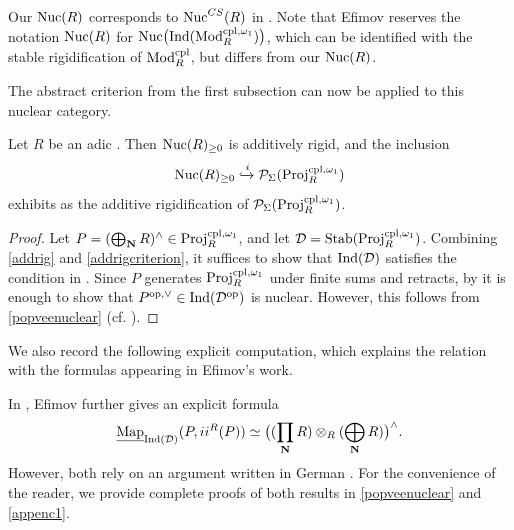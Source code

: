 \documentclass[a4paper,10pt, oneside]{amsart}
\begin{document}
\begin{rem}
	Our $\mathrm{Nuc}(R)$ corresponds to $\mathrm{Nuc}^{CS}(R)$ in \cite{efimov2025localizinginvariantsinverselimits}. Note that Efimov reserves the notation $\mathrm{Nuc}(R)$ for $\mathrm{Nuc}\big(\mathrm{Ind}(\operatorname{Mod}_R^{\mathrm{cpl},\omega_1})\big)$, which can be identified with the stable rigidification of $\mathrm{Mod}_{R}^{\mathrm{cpl}}$, but differs from our $\mathrm{Nuc}(R)$.
\end{rem}
	The abstract criterion from the first subsection can now be applied to this nuclear category.
	
	\begin{thm}\label{nucadrig}
		Let $R$ be an adic \einfring. Then $\mathrm{Nuc}(R)_{\geq 0}$ is additively rigid, and the inclusion $$\mathrm{Nuc}(R)_{\geq 0}\xhookrightarrow{i}\mathcal{P}_{\Sigma}(\mathrm{Proj}_R^{\mathrm{cpl},\omega_1})$$  exhibits \nucrgeq as the additive rigidification of $\mathcal{P}_{\Sigma}(\mathrm{Proj}_R^{\mathrm{cpl},\omega_1})$.
	\end{thm}
	
	\begin{proof} 
		Let $P=(\bigoplus_{\mathbf{N}} R)^{\wedge}\in \mathrm{Proj}_R^{\mathrm{cpl},\omega_1}$, and let $\mathcal{D}=\mathrm{Stab}(\mathrm{Proj}_R^{\mathrm{cpl},\omega_1})$.	Combining \cref{addrig} and \cref{addrigcriterion}, it suffices to show that $\mathrm{Ind}(\mathcal{D})$ satisfies the condition in \cite[Proposition 1.30]{efimov2025localizinginvariantsinverselimits}. Since $P$ generates $\mathrm{Proj}_R^{\mathrm{cpl},\omega_1}$ under finite sums and retracts, by \cite[Proposition 1.33]{efimov2025localizinginvariantsinverselimits} it is enough to show that $P^{\mathrm{op},\vee}\in \mathrm{Ind}(\mathcal{D}^{\mathrm{op}})$ is nuclear.  However, this follows from  \cref{popveenuclear} (cf. \cite[Proposition 7.4]{efimov2025localizinginvariantsinverselimits}). 
	\end{proof}
	We also record the following explicit computation, which explains the relation with the formulas appearing in Efimov's work.
	\begin{rem}
		In \cite[Corollary 7.7]{efimov2025localizinginvariantsinverselimits}, Efimov further gives an explicit formula $$
		\underline{\operatorname{Map}}_{\mathrm{Ind}(\mathcal{D})}(P,ii^R(P))\simeq \big((\prod_{\mathbf{N}} R)\otimes_R (\bigoplus_{\mathbf{N}} R)\big)^\wedge.
		$$	However, both \cite[Proposition 7.4 and Corollary 7.7]{efimov2025localizinginvariantsinverselimits} rely on an argument written in German \cite[Satz 3.8]{andreychev2023k}. For the convenience of the reader, we provide complete proofs of both results in \cref{popveenuclear} and \cref{appenc1}.
	\end{rem}
	
\end{document}
